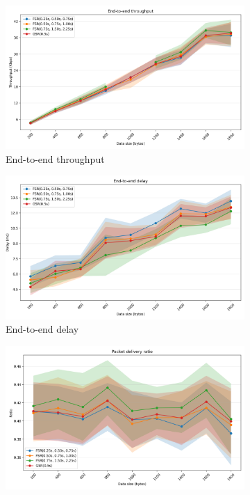 \documentclass{winslabreport}
\begin{document}
\begin{figure}
    \centering
    \begin{subfigure}[b]{0.45\textwidth}
        \includegraphics[width=\textwidth]{../figures/messageLength/end-to-end_throughput.png}
        \caption{End-to-end throughput}
        \label{fig:tput_mlen}
    \end{subfigure}
    \hfill
    \begin{subfigure}[b]{0.45\textwidth}
        \includegraphics[width=\textwidth]{../figures/messageLength/end-to-end_delay.png}
        \caption{End-to-end delay}
        \label{fig:delay_mlen}
    \end{subfigure}
    \begin{subfigure}[b]{0.45\textwidth}
        \includegraphics[width=\textwidth]{../figures/messageLength/packet_delivery_ratio.png}

\end{subfigure}
\end{figure}
\end{document}
